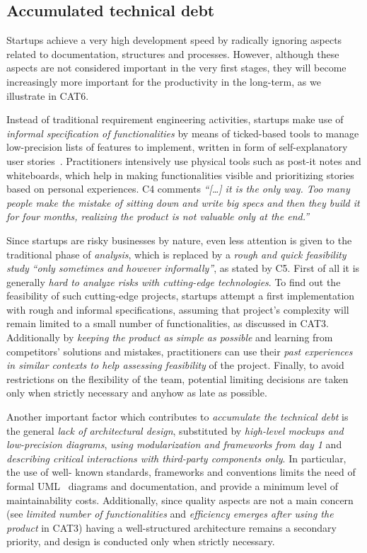 \documentclass[10pt,journal,letterpaper,compsoc]{IEEEtran}
\begin{document}
\subsection{Accumulated technical debt}\label{res:gsm:cat5} 
Startups achieve a very high development speed by radically ignoring aspects 
related to documentation, structures and processes. However, although these 
aspects are not considered important in the very first stages, they will become
increasingly more important for the productivity in the long-term, as we
illustrate in CAT6.

Instead of traditional requirement engineering activities, startups make use of
\textit{informal specification of functionalities} by means of ticked-based
tools to manage low-precision lists of features to implement, written in form of
self-explanatory user stories~\cite{AgilePlan}. Practitioners intensively use
physical tools such as post-it notes and whiteboards, which help in making
functionalities visible and prioritizing stories based on personal experiences.
C4 comments \textit{``[\ldots] it is the only way. Too many people make the
mistake of sitting down and write big specs and then they build it for four
months, realizing the product is not valuable only at the end.''}

Since startups are risky businesses by nature, even less attention is given to
the traditional phase of \textit{analysis}, which is replaced by a \textit{rough
and quick feasibility study} \textit{``only sometimes and however
informally''}, as stated by C5. First of all it is generally \textit{hard to
analyze risks with cutting-edge technologies}. To find out the feasibility of
such cutting-edge projects, startups attempt a first implementation with rough
and informal specifications, assuming that project's complexity will remain
limited to a small number of functionalities, as discussed in CAT3. Additionally
by \textit{keeping the product as simple as possible} and learning from
competitors' solutions and mistakes, practitioners can use their \textit{past
experiences in similar contexts to help assessing feasibility} of the project.
Finally, to avoid restrictions on the flexibility of the team, potential
limiting decisions are taken only when strictly necessary and anyhow as late as
possible.

Another important factor which contributes to \textit{accumulate the technical
debt} is the general \textit{lack of architectural design}, substituted by
\textit{high-level mockups and low-precision diagrams}, \textit{using
modularization and frameworks from day 1} and \textit{describing critical
interactions with third-party components only}. In particular, the use of well-
known standards, frameworks and conventions limits the need of formal 
UML~\cite{UML} diagrams and documentation, and provide a minimum level of
maintainability costs. Additionally, since quality aspects are not a main
concern (see \textit{limited number of functionalities} and \textit{efficiency
emerges after using the product} in CAT3) having a well-structured architecture
remains a secondary priority, and design is conducted only when strictly
necessary.
\end{document}
